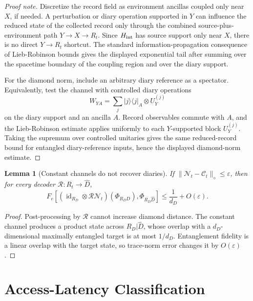 \documentclass[11pt]{article}
\newtheorem{lemma}{Lemma}
\newcommand{\cN}{\mathcal N}
\newcommand{\cC}{\mathcal C}
\newcommand{\cR}{\mathcal R}
\begin{document}
\begin{proof}[Proof note]
Discretize the record field as environment ancillas coupled only near
$X$, if needed.  A perturbation or diary operation supported in $Y$ can
influence the reduced state of the collected record only through the
combined source-plus-environment path $Y\to X\to R_t$.  Since
$H_{\rm int}$ has source support only near $X$, there is no direct
$Y\to R_t$ shortcut.  The standard information-propagation consequence
of Lieb-Robinson bounds \citep{Lieb1972FiniteVelocity,Bravyi2006LR}
gives the displayed exponential tail after summing over the spacetime
boundary of the coupling region and over the diary support.

For the diamond norm, include an arbitrary diary reference as a
spectator.  Equivalently, test the channel with controlled diary
operations
\begin{equation}
  W_{YA}=\sum_j |j\rangle\!\langle j|_A\otimes U_Y^{(j)}
\end{equation}
on the diary support and an ancilla $A$.  Record observables commute
with $A$, and the Lieb-Robinson estimate applies uniformly to each
$Y$-supported block $U_Y^{(j)}$.  Taking the supremum over controlled
unitaries gives the same reduced-record bound for entangled
diary-reference inputs, hence the displayed diamond-norm estimate.
\end{proof}

\begin{lemma}[Constant channels do not recover diaries]
\label{lem:constant}
If $\lVert \cN_t-\cC_t\rVert_\diamond\le \varepsilon$, then for every
decoder $\cR:R_t\to \widehat D$,
\begin{equation}
  F_e\!\left[
  (\operatorname{id}_{R_D}\otimes \cR\cN_t)(\Phi_{R_DD}),
  \Phi_{R_D\widehat D}
  \right]
  \le
  \frac{1}{d_D}+O(\varepsilon).
\end{equation}
\end{lemma}

\begin{proof}
Post-processing by $\cR$ cannot increase diamond distance.  The constant
channel produces a product state across $R_D|\widehat D$, whose overlap
with a $d_D$-dimensional maximally entangled target is at most $1/d_D$.
Entanglement fidelity is a linear overlap with the target state, so
trace-norm error changes it by $O(\varepsilon)$.
\end{proof}

\section{Access-Latency Classification}
\end{document}
